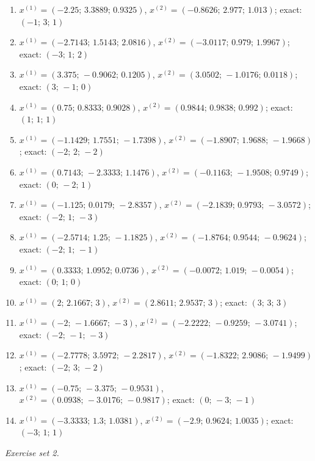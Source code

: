 \begin{enumerate}[label=\arabic*., leftmargin=*, itemsep=1pt]
\item $x^{(1)}=(-2.25;\,3.3889;\,0.9325)$, $x^{(2)}=(-0.8626;\,2.977;\,1.013)$; exact: $(-1;\,3;\,1)$
\item $x^{(1)}=(-2.7143;\,1.5143;\,2.0816)$, $x^{(2)}=(-3.0117;\,0.979;\,1.9967)$; exact: $(-3;\,1;\,2)$
\item $x^{(1)}=(3.375;\,-0.9062;\,0.1205)$, $x^{(2)}=(3.0502;\,-1.0176;\,0.0118)$; exact: $(3;\,-1;\,0)$
\item $x^{(1)}=(0.75;\,0.8333;\,0.9028)$, $x^{(2)}=(0.9844;\,0.9838;\,0.992)$; exact: $(1;\,1;\,1)$
\item $x^{(1)}=(-1.1429;\,1.7551;\,-1.7398)$, $x^{(2)}=(-1.8907;\,1.9688;\,-1.9668)$; exact: $(-2;\,2;\,-2)$
\item $x^{(1)}=(0.7143;\,-2.3333;\,1.1476)$, $x^{(2)}=(-0.1163;\,-1.9508;\,0.9749)$; exact: $(0;\,-2;\,1)$
\item $x^{(1)}=(-1.125;\,0.0179;\,-2.8357)$, $x^{(2)}=(-2.1839;\,0.9793;\,-3.0572)$; exact: $(-2;\,1;\,-3)$
\item $x^{(1)}=(-2.5714;\,1.25;\,-1.1825)$, $x^{(2)}=(-1.8764;\,0.9544;\,-0.9624)$; exact: $(-2;\,1;\,-1)$
\item $x^{(1)}=(0.3333;\,1.0952;\,0.0736)$, $x^{(2)}=(-0.0072;\,1.019;\,-0.0054)$; exact: $(0;\,1;\,0)$
\item $x^{(1)}=(2;\,2.1667;\,3)$, $x^{(2)}=(2.8611;\,2.9537;\,3)$; exact: $(3;\,3;\,3)$
\item $x^{(1)}=(-2;\,-1.6667;\,-3)$, $x^{(2)}=(-2.2222;\,-0.9259;\,-3.0741)$; exact: $(-2;\,-1;\,-3)$
\item $x^{(1)}=(-2.7778;\,3.5972;\,-2.2817)$, $x^{(2)}=(-1.8322;\,2.9086;\,-1.9499)$; exact: $(-2;\,3;\,-2)$
\item $x^{(1)}=(-0.75;\,-3.375;\,-0.9531)$, $x^{(2)}=(0.0938;\,-3.0176;\,-0.9817)$; exact: $(0;\,-3;\,-1)$
\item $x^{(1)}=(-3.3333;\,1.3;\,1.0381)$, $x^{(2)}=(-2.9;\,0.9624;\,1.0035)$; exact: $(-3;\,1;\,1)$
\end{enumerate}
\par\noindent\emph{Exercise set 2.}\nopagebreak
